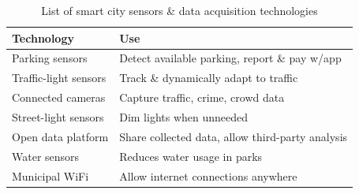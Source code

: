 \documentclass[12pt]{article}                               %
\begin{document}
\begin{table}[H]
    \centering
    \small
    \begin{tabular}{l|l}
        \textbf{Technology} & \textbf{Use} \\
        \hline{}
        
        Parking sensors &
        Detect available parking, report \& pay w/app \\
        \hline{}
        
        Traffic-light sensors &
        Track \& dynamically adapt to traffic \\
        \hline{}
        
        Connected cameras &
        Capture traffic, crime, crowd data \\
        \hline{}
        
        Street-light sensors &
        Dim lights when unneeded \\
        \hline{}
        
        Open data platform &
        Share collected data, allow third-party analysis \\
        \hline{}
        
        Water sensors &
        Reduces water usage in parks \\
        \hline{}
        
        Municipal WiFi &
        Allow internet connections anywhere
    \end{tabular}
    \caption{List of smart city sensors \& data acquisition technologies}
    \label{tab:smart_city_sensors}
\end{table}
\end{document}
